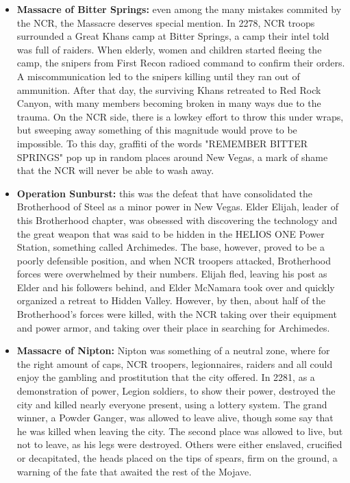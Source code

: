 \documentclass[11pt]{article} %
\begin{document}
\begin{itemize}
	\item \textbf{Massacre of Bitter Springs:} even among the many mistakes commited by the NCR, the Massacre deserves special mention. In 2278, NCR troops surrounded a Great Khans camp at Bitter Springs, a camp their intel told was full of raiders. When elderly, women and children started fleeing the camp, the snipers from First Recon radioed command to confirm their orders. A miscommunication led to the snipers killing until they ran out of ammunition. After that day, the surviving Khans retreated to Red Rock Canyon, with many members becoming broken in many ways due to the trauma. On the NCR side, there is a lowkey effort to throw this under wraps, but sweeping away something of this magnitude would prove to be impossible. To this day, graffiti of the words "REMEMBER BITTER SPRINGS" pop up in random places around New Vegas, a mark of shame that the NCR will never be able to wash away.
	
	\item \textbf{Operation Sunburst:} this was the defeat that have consolidated the Brotherhood of Steel as a minor power in New Vegas. Elder Elijah, leader of this Brotherhood chapter, was obsessed with discovering the technology and the great weapon that was said to be hidden in the HELIOS ONE Power Station, something called Archimedes. The  base, however, proved to be a poorly defensible position, and when NCR troopers attacked, Brotherhood forces were overwhelmed by their numbers. Elijah fled, leaving his post as Elder and his followers behind, and Elder McNamara took over and quickly organized a retreat to Hidden Valley. However, by then, about half of the Brotherhood's forces were killed, with the NCR taking over their equipment and power armor, and taking over their place in searching for Archimedes.
	
	\item \textbf{Massacre of Nipton:} Nipton was something of a neutral zone, where for the right amount of caps, NCR troopers, legionnaires, raiders and all could enjoy the gambling and prostitution that the city offered. In 2281, as a demonstration of power, Legion soldiers, to show their power, destroyed the city and killed nearly everyone present, using a lottery system. The grand winner, a Powder Ganger, was allowed to leave alive, though some say that he was killed when leaving the city. The second place was allowed to live, but not to leave, as his legs were destroyed. Others were either enslaved, crucified or decapitated, the heads placed on the tips of spears, firm on the ground, a warning of the fate that awaited the rest of the Mojave.
	

\end{itemize}
\end{document}

